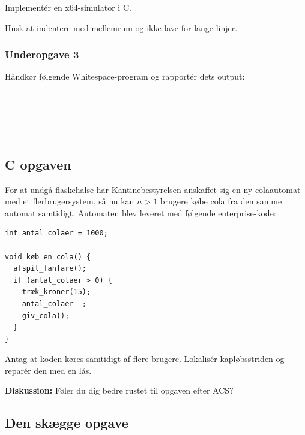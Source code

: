 Implementér en x64-simulator i C.

Husk at indentere med mellemrum og ikke lave for lange linjer.

\subsubsection{Underopgave 3}
\vspace{-0.2cm}

Håndkør følgende Whitespace-program og rapportér dets output:
\begin{verbatim}





\end{verbatim}

\newpage
\subsection{C opgaven}
For at undgå flaskehalse har Kantinebestyrelsen anskaffet sig en ny colaautomat
med et flerbrugersystem, så nu kan $n > 1$ brugere købe cola fra den samme
automat samtidigt.  Automaten blev leveret med følgende enterprise-kode:
\begin{verbatim}
int antal_colaer = 1000;

void køb_en_cola() {
  afspil_fanfare();
  if (antal_colaer > 0) {
    træk_kroner(15);
    antal_colaer--;
    giv_cola();
  }
}
\end{verbatim}
Antag at koden køres samtidigt af flere brugere.  Lokalisér kapløbsstriden og
reparér den med en lås.

\textbf{Diskussion:} Føler du dig bedre rustet til opgaven efter ACS?

\newpage

\subsection{Den skægge opgave}

